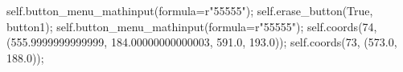 self.button_menu_mathinput(formula=r"55555");
self.erase_button(True, button1);
self.button_menu_mathinput(formula=r"55555");
self.coords(74, (555.9999999999999, 184.00000000000003, 591.0, 193.0));
self.coords(73, (573.0, 188.0));
